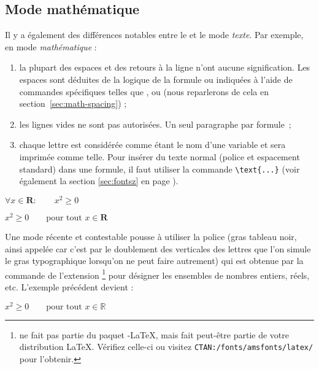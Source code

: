 \subsection{Mode mathématique}


Il y a également des différences notables entre le  et le mode \emph{texte}. Par exemple, en mode
\emph{mathématique} :

\begin{enumerate}
\item {}
      la plupart des espaces et des retours à la ligne n'ont aucune
      signification. Les espaces sont déduites de la logique de la
      formule ou indiquées à l'aide de commandes spécifiques telles
      que \ci{,},  ou (nous reparlerons de cela en
      section~\ref{sec:math-spacing}) ;
\item les lignes vides ne sont pas autorisées. Un seul paragraphe par
      formule~;
\item chaque lettre est considérée comme étant le nom d'une variable
      et sera imprimée comme telle. Pour insérer du  texte
      normal (police et espacement standard) dans une formule, il 
      faut utiliser la commande \verb|\text{...}| (voir également la
      section \ref{sec:fontsz} en page \pageref{sec:fontsz}).
\end{enumerate}

\begin{example}
$\forall x \in \mathbf{R}:
 \qquad x^{2} \geq 0$
\end{example}
\begin{example}
$x^{2} \geq 0\qquad
\text{pour tout } x\in\mathbf{R}$
\end{example}

Une mode récente et contestable pousse à utiliser la police 
 (gras tableau noir, ainsi appelée car c'est par
le doublement des verticales des lettres que l'on simule le gras
typographique lorsqu'on ne peut faire autrement) qui est obtenue par
la commande  de l'extension 
\footnote{ ne fait pas partie du paquet \AmS-\LaTeX{},
  mais fait peut-être partie de votre distribution \LaTeX{}. Vérifiez
  celle-ci ou visitez \texttt{CTAN:/fonts/amsfonts/latex/} pour
  l'obtenir.}
pour désigner les ensembles de nombres entiers, réels, etc.
\ifx\mathbb\undefined\else
L'exemple précédent devient :
\begin{example}
$x^{2} \geq 0\qquad
 \text{pour tout } x 
 \in \mathbb{R}$
\end{example}
\fi

